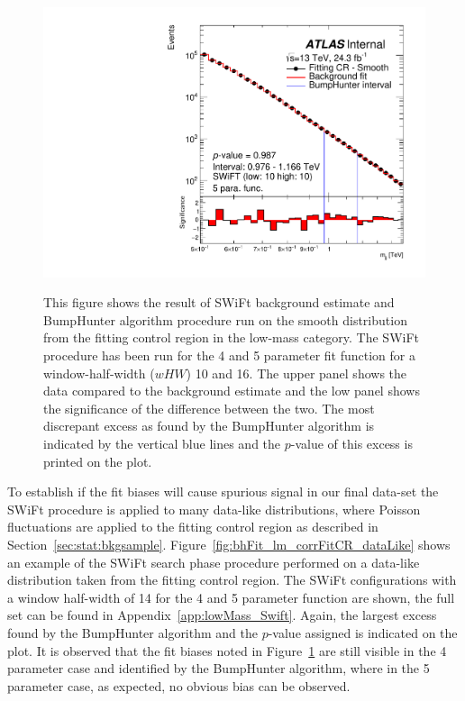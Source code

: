 \begin{figure}[!htb]
{  \includegraphics[width=0.45\linewidth, angle=0]{figs/Dibjet/LowMass/FitStudy/bhFit_corrFitCR_smooth_5para_low10_high10.pdf}
}
\vspace{10pt}
\caption{\label{fig:bhFit_lm_corrFitCR_smooth}
  This figure shows the result of SWiFt background estimate and {\sc BumpHunter} algorithm procedure run on the smooth distribution from the fitting control region in the low-mass category.
  The SWiFt procedure has been run for the 4 and 5 parameter fit function for a window-half-width ($wHW$) 10 and 16.
  The upper panel shows the data compared to the background estimate and the low panel shows the significance of the difference between the two.
  The most discrepant excess as found by the {\sc BumpHunter} algorithm is indicated by the vertical blue lines and the $p$-value of this excess is printed on the plot. }
\end{figure}

To establish if the fit biases will cause spurious signal in our final data-set
the SWiFt procedure is applied to many data-like distributions,
where Poisson fluctuations are applied to the fitting control region as described in Section~\ref{sec:stat:bkgsample}.
Figure~\ref{fig:bhFit_lm_corrFitCR_dataLike} shows an example of the SWiFt search phase procedure performed on a data-like distribution taken from the fitting control region.
The SWiFt configurations with a window half-width of 14 for the 4 and 5 parameter function are shown, the full set can be found in Appendix~\ref{app:lowMass_Swift}.
Again, the largest excess found by the {\sc BumpHunter} algorithm and the $p$-value assigned is indicated on the plot.
It is observed that the fit biases noted in Figure~\ref{fig:bhFit_lm_corrFitCR_smooth} are still visible in the 4 parameter case and identified by the {\sc BumpHunter} algorithm,
where in the 5 parameter case, as expected, no obvious bias can be observed.

